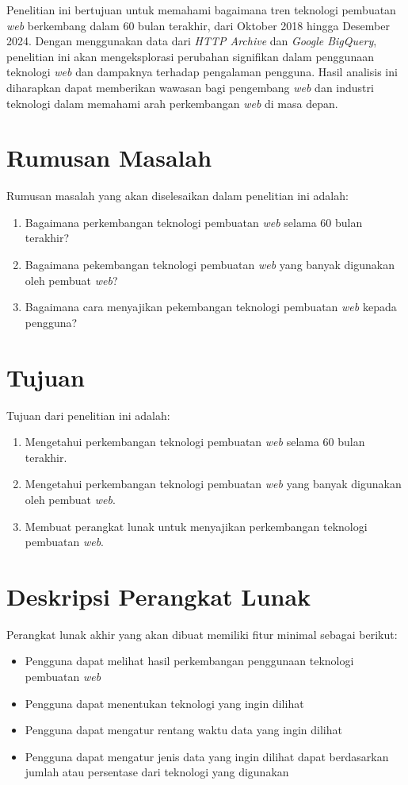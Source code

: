 \documentclass[a4paper,twoside]{article}
\newcommand{\web}{\textit{web}\xspace}
\begin{document}
Penelitian ini bertujuan untuk memahami bagaimana tren teknologi pembuatan \web berkembang dalam 60 bulan terakhir, dari Oktober 2018 hingga Desember 2024. Dengan menggunakan data dari \textit{HTTP Archive} dan \textit{Google BigQuery}, penelitian ini akan mengeksplorasi perubahan signifikan dalam penggunaan teknologi \web dan dampaknya terhadap pengalaman pengguna. Hasil analisis ini diharapkan dapat memberikan wawasan bagi pengembang \web dan industri teknologi dalam memahami arah perkembangan \web di masa depan.
	
	\section{Rumusan Masalah}
	Rumusan masalah yang akan diselesaikan dalam penelitian ini adalah:
    \begin{enumerate}
        \item Bagaimana perkembangan teknologi pembuatan \web selama 60 bulan terakhir?
        \item Bagaimana pekembangan teknologi pembuatan \web yang banyak digunakan oleh pembuat \web?
        \item Bagaimana cara menyajikan pekembangan teknologi pembuatan \web kepada pengguna?
    \end{enumerate}
	
	\section{Tujuan}
	Tujuan dari penelitian ini adalah:
    \begin{enumerate}
        \item Mengetahui perkembangan teknologi pembuatan \web selama 60 bulan terakhir.
        \item Mengetahui perkembangan teknologi pembuatan \web yang banyak digunakan oleh pembuat \web.
        \item Membuat perangkat lunak untuk menyajikan perkembangan teknologi pembuatan \web.
    \end{enumerate}
	
	\section{Deskripsi Perangkat Lunak}
	Perangkat lunak akhir yang akan dibuat memiliki fitur minimal sebagai berikut:
	\begin{itemize}
		\item Pengguna dapat melihat hasil perkembangan penggunaan teknologi pembuatan \web
		\item Pengguna dapat menentukan teknologi yang ingin dilihat  
		\item Pengguna dapat mengatur rentang waktu data yang ingin dilihat
		\item Pengguna dapat mengatur jenis data yang ingin dilihat dapat berdasarkan jumlah atau persentase dari teknologi yang digunakan
	\end{itemize}
	
\end{document}
